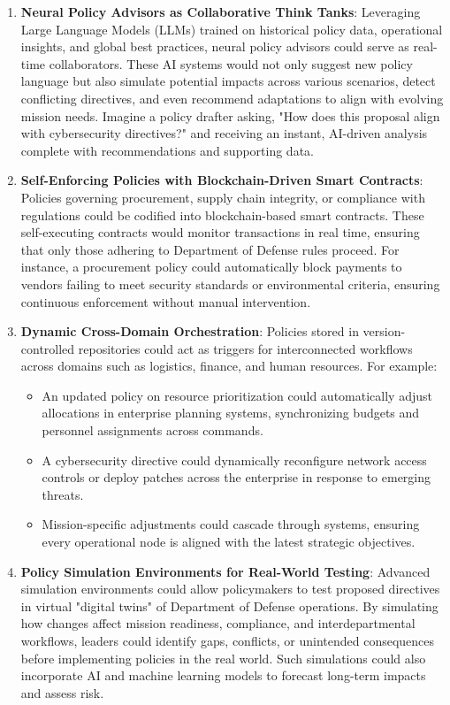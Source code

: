 \documentclass[11pt]{article}
\begin{document}
	\begin{enumerate}
		\item \textbf{Neural Policy Advisors as Collaborative Think Tanks}:
		Leveraging Large Language Models (LLMs) trained on historical policy data, operational insights, and global best practices, neural policy advisors could serve as real-time collaborators. These AI systems would not only suggest new policy language but also simulate potential impacts across various scenarios, detect conflicting directives, and even recommend adaptations to align with evolving mission needs. Imagine a policy drafter asking, "How does this proposal align with cybersecurity directives?" and receiving an instant, AI-driven analysis complete with recommendations and supporting data.

		\item \textbf{Self-Enforcing Policies with Blockchain-Driven Smart Contracts}:
		Policies governing procurement, supply chain integrity, or compliance with regulations could be codified into blockchain-based smart contracts. These self-executing contracts would monitor transactions in real time, ensuring that only those adhering to Department of Defense rules proceed. For instance, a procurement policy could automatically block payments to vendors failing to meet security standards or environmental criteria, ensuring continuous enforcement without manual intervention.

		\item \textbf{Dynamic Cross-Domain Orchestration}:
		Policies stored in version-controlled repositories could act as triggers for interconnected workflows across domains such as logistics, finance, and human resources. For example:
		\begin{itemize}
			\item An updated policy on resource prioritization could automatically adjust allocations in enterprise planning systems, synchronizing budgets and personnel assignments across commands.
			\item A cybersecurity directive could dynamically reconfigure network access controls or deploy patches across the enterprise in response to emerging threats.
			\item Mission-specific adjustments could cascade through systems, ensuring every operational node is aligned with the latest strategic objectives.
		\end{itemize}

		\item \textbf{Policy Simulation Environments for Real-World Testing}:
		Advanced simulation environments could allow policymakers to test proposed directives in virtual "digital twins" of Department of Defense operations. By simulating how changes affect mission readiness, compliance, and interdepartmental workflows, leaders could identify gaps, conflicts, or unintended consequences before implementing policies in the real world. Such simulations could also incorporate AI and machine learning models to forecast long-term impacts and assess risk.


\end{enumerate}
\end{document}

